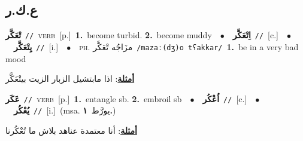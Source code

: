 \documentclass[10pt,a4paper,twoside]{article} %
\begin{document}
\begin{multicols}{2}
\vspace{-3mm}
\subsection*{\color{blue}\foreignlanguage{arabic}{ع.ك.ر}\color{blue}{}} 

{\setlength\topsep{0pt}\textbf{\foreignlanguage{arabic}{تْعَكَّر}}\ {\color{gray}\texttt{//}\color{black}}\ \textsc{verb}\ [p.]\ \textbf{1.}~become turbid.  \textbf{2.}~become muddy\ \ $\bullet$\ \ \setlength\topsep{0pt}\textbf{\foreignlanguage{arabic}{اِتْعَكَّر}}\ {\color{gray}\texttt{//}\color{black}}\ [c.]\ \ $\bullet$\ \ \setlength\topsep{0pt}\textbf{\foreignlanguage{arabic}{يِتْعَكَّر}}\ {\color{gray}\texttt{//}\color{black}}\ [i.]\ \ $\bullet$\ \ \textsc{ph.} \color{gray} \foreignlanguage{arabic}{مزَاجُه تْعَكَّر}\color{black}\ {\color{gray}\texttt{/{\sffamily mazaː(dʒ)o tʕakkar}/}\color{black}}\ \textbf{1.}~be in a very bad mood\  \begin{flushright}\color{gray}\foreignlanguage{arabic}{\textbf{\underline{\foreignlanguage{arabic}{أمثلة}}}: اذا مابتشيل الزبار الزيت بيتْعَكَّر}\end{flushright}\color{black}} \vspace{2mm}

{\setlength\topsep{0pt}\textbf{\foreignlanguage{arabic}{عَكَر}}\ {\color{gray}\texttt{//}\color{black}}\ \textsc{verb}\ [p.]\ \textbf{1.}~entangle sb.  \textbf{2.}~embroil sb\ \ $\bullet$\ \ \setlength\topsep{0pt}\textbf{\foreignlanguage{arabic}{اُعْكُر}}\ {\color{gray}\texttt{//}\color{black}}\ [c.]\ \ $\bullet$\ \ \setlength\topsep{0pt}\textbf{\foreignlanguage{arabic}{يُعْكُر}}\ {\color{gray}\texttt{//}\color{black}}\ [i.]\ \color{gray}(msa. \foreignlanguage{arabic}{يورَّط}~\foreignlanguage{arabic}{\textbf{١.}})\color{black}\  \begin{flushright}\color{gray}\foreignlanguage{arabic}{\textbf{\underline{\foreignlanguage{arabic}{أمثلة}}}: أنا معتمدة عناهد بلاش ما تُعْكُرنا}\end{flushright}\color{black}} \vspace{2mm}


\end{multicols}
\end{document}
